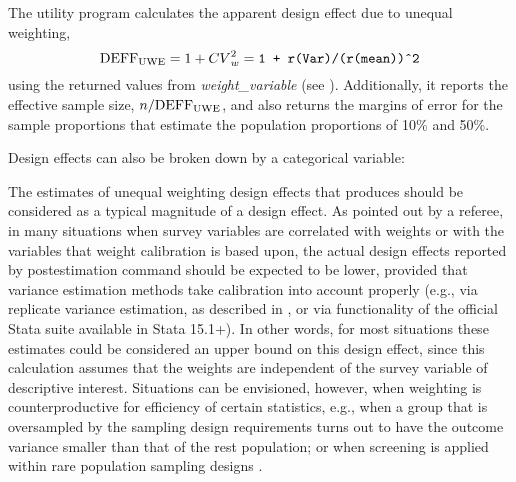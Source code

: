 The utility program  calculates the apparent design effect due to unequal weighting,
$${\rm DEFF_{UWE}}=1 + {CV}^2_w = \mbox{\texttt{1 + r(Var)/(r(mean))\^{}2}}$$
using the returned values from  {\it weight{\_}variable} (see ).
Additionally, it reports the effective sample size, $n/{\rm DEFF_{UWE}}$, and also returns
the margins of error for the sample proportions that estimate the population proportions of
10\% and 50\%.

\noindent
\begin{stlog}
\nullskip
\end{stlog}

Design effects can also be broken down by a categorical variable:

\noindent
\begin{stlog}
\nullskip
\end{stlog}


The estimates of unequal weighting design effects that  produces
should be considered as a typical magnitude of a design effect.
As pointed out by a referee, in many situations when survey variables are correlated with weights
or with the variables that weight calibration is based upon, the actual
design effects reported by postestimation command  should be expected
to be lower, provided that variance estimation methods take calibration
into account properly (e.g., via replicate variance estimation, as described
in \citet{kolenikov:2010}, or via  functionality
of the official Stata  suite available in Stata 15.1+).
In other words, for most situations these estimates could be considered an upper bound
on this design effect, since this calculation assumes that the weights are independent of
the survey variable of descriptive interest. Situations can be envisioned, however,
when weighting is counterproductive for efficiency of certain statistics,
e.g., when a group that is oversampled by the sampling design requirements
turns out to have the outcome variance smaller than that of the rest population;
or when screening is applied within rare population sampling designs
\citep{kalton:anderson:1986,kalton:2009}.

